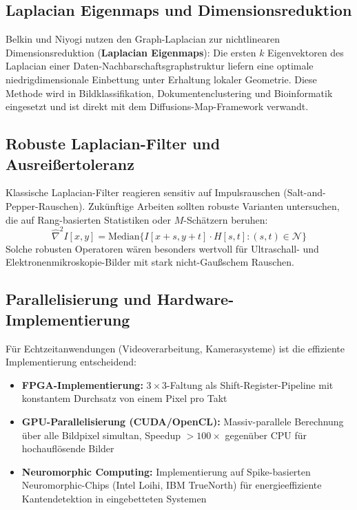 ﻿\documentclass[a4paper,12pt]{article}
\theoremstyle{definition}
\begin{document}
\subsection{Laplacian Eigenmaps und Dimensionsreduktion}

Belkin und Niyogi \cite{belkin2003} nutzen den Graph-Laplacian zur nichtlinearen Dimensionsreduktion
(\textbf{Laplacian Eigenmaps}): Die ersten $k$ Eigenvektoren des Laplacian einer Daten-Nachbarschaftsgraphstruktur
liefern eine optimale niedrigdimensionale Einbettung unter Erhaltung lokaler Geometrie. Diese Methode
wird in Bildklassifikation, Dokumentenclustering und Bioinformatik eingesetzt und ist direkt mit dem
Diffusions-Map-Framework \cite{coifman2006} verwandt.

\subsection{Robuste Laplacian-Filter und Ausreißertoleranz}

Klassische Laplacian-Filter reagieren sensitiv auf Impulsrauschen (Salt-and-Pepper-Rauschen). Zukünftige
Arbeiten sollten robuste Varianten untersuchen, die auf Rang-basierten Statistiken oder
$M$-Schätzern beruhen:
\[
    \hat{\nabla}^2 I[x,y] = \text{Median}\bigl\{I[x+s,y+t] \cdot H[s,t] : (s,t) \in \mathcal{N}\bigr\}
\]
Solche robusten Operatoren wären besonders wertvoll für Ultraschall- und Elektronenmikroskopie-Bilder
mit stark nicht-Gaußschem Rauschen.

\subsection{Parallelisierung und Hardware-Implementierung}

Für Echtzeitanwendungen (Videoverarbeitung, Kamerasysteme) ist die effiziente Implementierung
entscheidend:
\begin{itemize}
    \item \textbf{FPGA-Implementierung:} $3\times3$-Faltung als Shift-Register-Pipeline mit
          konstantem Durchsatz von einem Pixel pro Takt
    \item \textbf{GPU-Parallelisierung (CUDA/OpenCL):} Massiv-parallele Berechnung über alle
          Bildpixel simultan, Speedup $> 100\times$ gegenüber CPU für hochauflösende Bilder
    \item \textbf{Neuromorphic Computing:} Implementierung auf Spike-basierten Neuromorphic-Chips
          (Intel Loihi, IBM TrueNorth) für energieeffiziente Kantendetektion in eingebetteten Systemen
\end{itemize}
\end{document}
